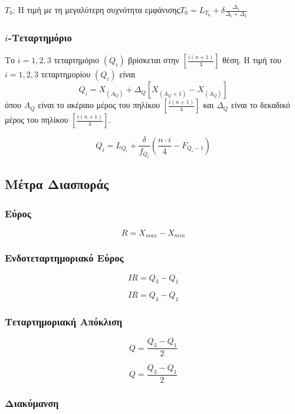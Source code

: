 $T_{0}$: Η τιμή με τη μεγαλύτερη συχνότητα εμφάνισης\hfill $T_{0}=L_{T_{0}}+\delta \frac{\Delta_{1}}{\Delta_{1}+\Delta_{2}}$


\subsubsection{$i$-Τεταρτημόριο}

Το $i=1,2,3$ τεταρτημόριο $(Q_{i})$ βρίσκεται στην $[\frac{i(n+1)}{4}]$ θέση. Η τιμή του $i=1,2,3$ τεταρτημορίου $(Q_{i})$ είναι \[Q_{i}=X_{(A_{Q})}+\Delta_{Q}[X_{(A_{Q}+1)}-X_{(A_{Q})}]\]όπου $A_{Q}$ είναι το ακέραιο μέρος του πηλίκου $[\frac{i(n+1)}{4}]$ και $\Delta_{Q}$ είναι το δεκαδικό μέρος του πηλίκου $[\frac{i(n+1)}{4}]$.

\[
Q_{i}=L_{Q_{i}}+\frac{\delta}{f_{Q_{i}}}\left(\frac{n\cdot i}{4}-F_{Q_{i}-1}\right)
\]

\subsection{Μέτρα Διασποράς}

\subsubsection{Εύρος}
\begin{multicols}{2}
  \[
  R=X_{max}-X_{min}
  \]
\end{multicols}


\subsubsection{Ενδοτεταρτημοριακό Εύρος}
\begin{multicols}{2}
  \[
  IR=Q_{3}-Q_{1}
  \]

  \[
  IR=Q_{3}-Q_{1}
  \]
\end{multicols}


\subsubsection{Τεταρτημοριακή Απόκλιση}

\begin{multicols}{2}
  \[
  Q=\frac{Q_{3}-Q_{1}}{2}
  \]

  \[
  Q=\frac{Q_{3}-Q_{1}}{2}
  \]

\end{multicols}

\subsubsection{Διακύμανση}

